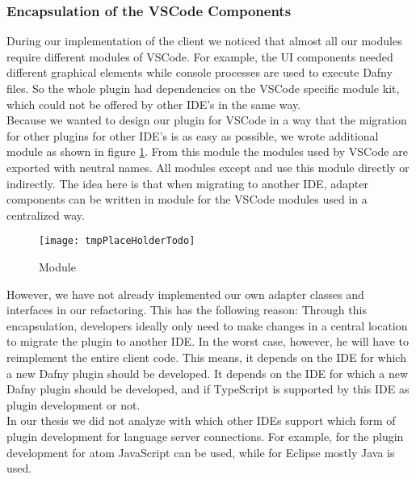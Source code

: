 \subsubsection{Encapsulation of the VSCode Components}

During our implementation of the client we noticed that almost all our modules require different modules of VSCode.
For example, the UI components needed different graphical elements while console processes are used to execute Dafny files.
So the whole plugin had dependencies on the VSCode specific module kit,
which could not be offered by other IDE's in the same way. \\

Because we wanted to design our plugin for VSCode in a way that the migration for other plugins
for other IDE's is as easy as possible, we wrote additional module  as shown in figure \ref{fig:packageIdeApi}.
From this module the modules used by VSCode are exported with neutral names.
All modules except  and  use this module directly or indirectly.
The idea here is that when migrating to another IDE, adapter components can be written in module 
for the VSCode modules used in a centralized way.

\begin{figure}[H]
    \centering
    \texttt{[image: tmpPlaceHolderTodo]}
    \caption{Module }
    \label{fig:packageIdeApi}
\end{figure}

However, we have not already implemented our own adapter classes and interfaces in our refactoring.
This has the following reason:
Through this encapsulation, developers ideally only need to make changes in a central location to migrate the plugin to another IDE.
In the worst case, however, he will have to reimplement the entire client code.
This means, it depends on the IDE for which a new Dafny plugin should be developed.
It depends on the IDE for which a new Dafny plugin should be developed,
and if TypeScript is supported by this IDE as plugin development or not.\\

In our thesis we did not analyze with which other IDEs support which form of plugin development for language server connections.
For example, for the plugin development for atom JavaScript \cite{plugin-atom} can be used,
while for Eclipse mostly Java \cite{plugin-eclipse} is used.


